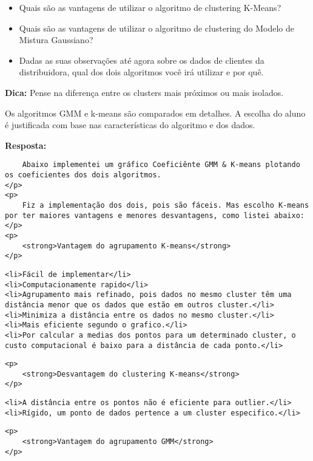 \documentclass[11pt]{article}
\providecommand{\tightlist}{%
      \setlength{\itemsep}{0pt}\setlength{\parskip}{0pt}}
\begin{document}
\begin{itemize}
\tightlist
\item
  Quais são as vantagens de utilizar o algoritmo de clustering K-Means?
\item
  Quais são as vantagens de utilizar o algoritmo de clustering do Modelo
  de Mistura Gaussiano?
\item
  Dadas as suas observações até agora sobre os dados de clientes da
  distribuidora, qual dos dois algoritmos você irá utilizar e por quê.
\end{itemize}

\textbf{Dica: }Pense na diferença entre os clusters mais próximos ou
mais isolados.

     Os algoritmos GMM e k-means são comparados em detalhes. A escolha do
aluno é justificada com base nas características do algoritmo e dos
dados. 

    \textbf{Resposta:}

\begin{verbatim}
    Abaixo implementei um gráfico Coeficiênte GMM & K-means plotando os coeficientes dos dois algoritmos.
</p>
<p>
    Fiz a implementação dos dois, pois são fáceis. Mas escolho K-means por ter maiores vantagens e menores desvantagens, como listei abaixo:
</p>
<p>
    <strong>Vantagem do agrupamento K-means</strong>
</p>
\end{verbatim}

\begin{verbatim}
<li>Fácil de implementar</li>
<li>Computacionamente rapido</li>
<li>Agrupamento mais refinado, pois dados no mesmo cluster têm uma distância menor que os dados que estão em outros cluster.</li>
<li>Minimiza a distância entre os dados no mesmo cluster.</li>
<li>Mais eficiente segundo o grafico.</li>
<li>Por calcular a medias dos pontos para um determinado cluster, o custo computacional é baixo para a distância de cada ponto.</li>
\end{verbatim}

\begin{verbatim}
<p>
    <strong>Desvantagem do clustering K-means</strong>
</p>
\end{verbatim}

\begin{verbatim}
<li>A distância entre os pontos não é eficiente para outlier.</li>
<li>Rígido, um ponto de dados pertence a um cluster especifico.</li>
\end{verbatim}

\begin{verbatim}
<p>
    <strong>Vantagem do agrupamento GMM</strong>
</p>
\end{verbatim}
\end{document}
